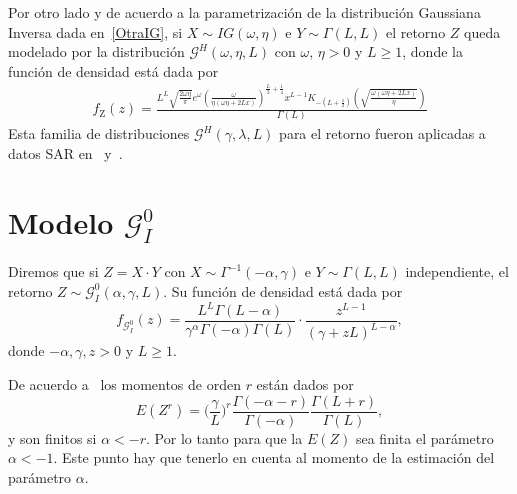 Por otro lado y de acuerdo a la parametrización de la distribución Gaussiana Inversa dada en~\eqref{OtraIG}, si $X\sim IG(\omega,\eta)$ e $Y \sim \Gamma(L,L)$ el retorno $Z$ queda modelado por la distribución $ \mathcal{G}^H(\omega,\eta,L)$ con $\omega, \, \eta >0$ y $L \geq 1$, donde la función de densidad está dada por 
\begin{align}
\label{ModeloGI}
f_{\text{Z}}( z) =\frac{L^L \sqrt{\frac{2 \omega  \eta }{\pi }} e^{\omega } \left(\frac{\omega }{\eta  (\omega  \eta +2 L
		x)}\right)^{\frac{L}{2}+\frac{1}{4}} x^{L-1} K_{-\left(L+\frac{1}{2}\right)}\left(\sqrt{\frac{\omega 
			(\omega  \eta +2 L x)}{\eta }}\right)}{\Gamma (L)}
\end{align}
Esta familia de distribuciones $\mathcal{G}^H(\gamma,\lambda,L)$ para el retorno fueron aplicadas a datos SAR en~\citet{Buemi2009} y~\citet{Jacobo2005}.


\section{Modelo $\mathcal{G}_I^0$}
\label{ModeloGI0}

Diremos que si $Z=X \cdot Y$ con $X \sim \Gamma^{-1}(-\alpha,\gamma)$ e $Y \sim \Gamma(L,L)$ independiente, el retorno $Z \sim \mathcal{G}_I^0(\alpha,\gamma,L)$. Su función de densidad está dada por 
\begin{equation}
f_{\mathcal{G}_I^{0}}( z) =\frac{L^{L}\Gamma ( L-\alpha
	) }{\gamma ^{\alpha }\Gamma ( -\alpha ) \Gamma (
	L) }\cdot  
\frac{z^{L-1}}{( \gamma +zL) ^{L-\alpha }},%
\label{ec_dens_gI0}
\end{equation}
donde $-\alpha,\gamma ,z>0$ y $L\geq 1$.

De acuerdo a~\citet{gambini2015} los momentos de orden $r$ están dados por
\begin{equation}
E(Z^r) =\Big(\frac{\gamma}{L}\Big)^r\frac{\Gamma ( -\alpha-r )}{ \Gamma (-\alpha) }
\frac{\Gamma (L+r )}{\Gamma (L)},
\label{moments_gI0}
\end{equation}
y son finitos si $\alpha<-r$. Por lo tanto para que la $E(Z)$ sea finita el parámetro $\alpha<-1$. Este punto hay que tenerlo en cuenta al momento de la estimación del parámetro $\alpha$.

